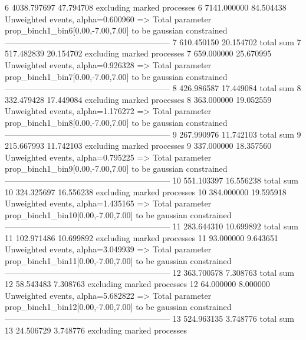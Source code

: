 6          4038.797697     47.794708       excluding marked processes    
6          7141.000000     84.504438       Unweighted events, alpha=0.600960
  => Total parameter prop_binch1_bin6[0.00,-7.00,7.00] to be gaussian constrained
------------------------------------------------------------
7          610.450150      20.154702       total sum                     
7          517.482839      20.154702       excluding marked processes    
7          659.000000      25.670995       Unweighted events, alpha=0.926328
  => Total parameter prop_binch1_bin7[0.00,-7.00,7.00] to be gaussian constrained
------------------------------------------------------------
8          426.986587      17.449084       total sum                     
8          332.479428      17.449084       excluding marked processes    
8          363.000000      19.052559       Unweighted events, alpha=1.176272
  => Total parameter prop_binch1_bin8[0.00,-7.00,7.00] to be gaussian constrained
------------------------------------------------------------
9          267.990976      11.742103       total sum                     
9          215.667993      11.742103       excluding marked processes    
9          337.000000      18.357560       Unweighted events, alpha=0.795225
  => Total parameter prop_binch1_bin9[0.00,-7.00,7.00] to be gaussian constrained
------------------------------------------------------------
10         551.103397      16.556238       total sum                     
10         324.325697      16.556238       excluding marked processes    
10         384.000000      19.595918       Unweighted events, alpha=1.435165
  => Total parameter prop_binch1_bin10[0.00,-7.00,7.00] to be gaussian constrained
------------------------------------------------------------
11         283.644310      10.699892       total sum                     
11         102.971486      10.699892       excluding marked processes    
11         93.000000       9.643651        Unweighted events, alpha=3.049939
  => Total parameter prop_binch1_bin11[0.00,-7.00,7.00] to be gaussian constrained
------------------------------------------------------------
12         363.700578      7.308763        total sum                     
12         58.543483       7.308763        excluding marked processes    
12         64.000000       8.000000        Unweighted events, alpha=5.682822
  => Total parameter prop_binch1_bin12[0.00,-7.00,7.00] to be gaussian constrained
------------------------------------------------------------
13         524.963135      3.748776        total sum                     
13         24.506729       3.748776        excluding marked processes    
